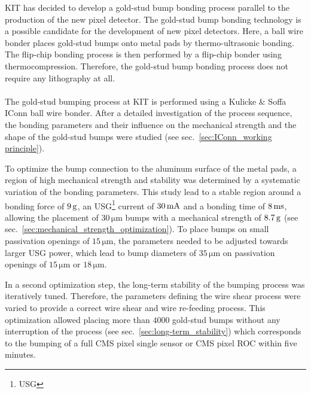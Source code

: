 \ac{KIT} has decided to develop a gold-stud bump bonding process parallel to the production of the new pixel detector. The gold-stud bump bonding technology is a possible candidate for the development of new pixel detectors. Here, a ball wire bonder places gold-stud bumps onto metal pads by thermo-ultrasonic bonding. The flip-chip bonding process is then performed by a flip-chip bonder using thermocompression. Therefore, the gold-stud bump bonding process does not require any lithography at all.\\
\\
The gold-stud bumping process at \ac{KIT} is performed using a Kulicke $\&$ Soffa IConn ball wire bonder. After a detailed investigation of the process sequence, the bonding parameters and their influence on the mechanical strength and the shape of the gold-stud bumps were studied (see sec.~\ref{sec:IConn_working principle}).

To optimize the bump connection to the aluminum surface of the metal pads, a region of high mechanical strength and stability was determined by a systematic variation of the bonding parameters. This study lead to a stable region around a bonding force of $9\,\rm{g}$, an \acs{USG}\footnote{\acf{USG}} current of $30\,\rm{mA}$ and a bonding time of $8\,\rm{ms}$, allowing the placement of $30\,\si{\micro \meter}$ bumps with a mechanical strength of $8.7\,\rm{g}$ (see sec.~\ref{sec:mechanical_strength_optimization}). To place bumps on small passivation openings of $15\,\si{\micro \meter}$, the parameters needed to be adjusted towards larger \acs{USG} power, which lead to bump diameters of $35\,\si{\micro \meter}$ on passivation openings of $15\,\si{\micro \meter}$ or $18\,\si{\micro \meter}$.

In a second optimization step, the long-term stability of the bumping process was iteratively tuned. Therefore, the parameters defining the wire shear process were varied to provide a correct wire shear and wire re-feeding process. This optimization allowed placing more than $4000$ gold-stud bumps without any interruption of the process (see sec.~\ref{sec:long-term_stability}) which corresponds to the bumping of a full \ac{CMS} pixel single sensor or \ac{CMS} pixel \ac{ROC} within five minutes.

